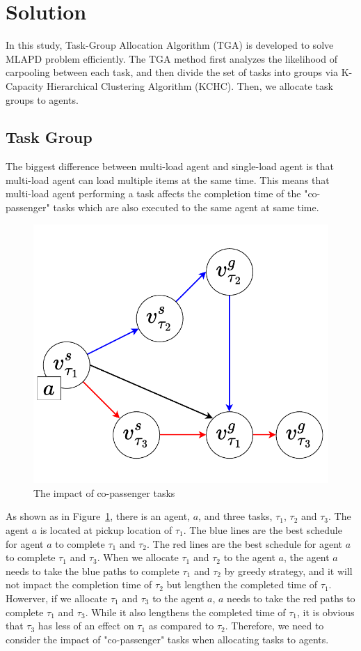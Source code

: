 \documentclass[sigconf,anonymous]{aamas}
\begin{document}
\section{Solution}

In this study, Task-Group Allocation Algorithm (TGA) is developed to solve MLAPD problem efficiently. 
The TGA method first analyzes the likelihood of carpooling between each task, 
and then divide the set of tasks into groups via K-Capacity Hierarchical Clustering Algorithm (KCHC). 
Then, we allocate task groups to agents.

\subsection{Task Group}
The biggest difference between multi-load agent and single-load agent 
is that multi-load agent can load multiple items at the same time. 
This means that multi-load agent performing a task affects the completion time of the "co-passenger" tasks 
which are also executed to the same agent at same time.
\begin{figure}[ht]
  \centering
  \includegraphics[width=0.5\linewidth]{Fig/carpooling.pdf}
  \caption{The impact of co-passenger tasks}
  \label{fig:carpooling}
\end{figure}

\begin{example}
As shown as in Figure~\ref{fig:carpooling}, there is an agent, $a$, 
and three tasks, $\tau_{1}$, $\tau_{2}$ and $\tau_{3}$.
The agent $a$ is located at pickup location of $\tau_{1}$.
The blue lines are the best schedule for agent $a$ to complete $\tau_{1}$ and $\tau_{2}$.
The red lines are the best schedule for agent $a$ to complete $\tau_{1}$ and $\tau_{3}$.
When we allocate $\tau_{1}$ and $\tau_{2}$ to the agent $a$,
the agent $a$ needs to take the blue paths to complete $\tau_{1}$ and $\tau_{2}$ by greedy strategy,
and it will not impact the completion time of $\tau_{2}$ but lengthen the completed time of $\tau_{1}$.
Howerver, if we allocate $\tau_{1}$ and $\tau_{3}$ to the agent $a$, 
$a$ needs to take the red paths to complete $\tau_{1}$ and $\tau_{3}$.
While it also lengthens the completed time of $\tau_{1}$, 
it is obvious that $\tau_3$ has less of an effect on $\tau_1$ as compared to $\tau_{2}$.
Therefore, we need to consider the impact of "co-passenger" tasks when allocating tasks to agents.
\end{example}
\end{document}

